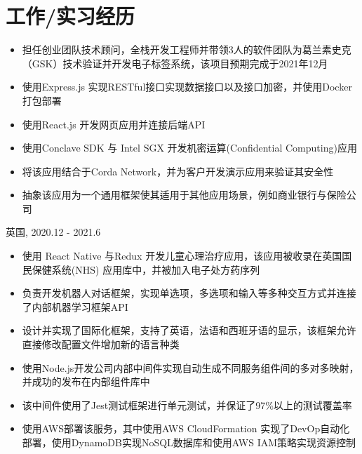 \documentclass{resume}
\begin{document}

\section{工作/实习经历}
\begin{itemize}
  \item 担任创业团队技术顾问，全栈开发工程师并带领3人的软件团队为葛兰素史克（GSK）技术验证并开发电子标签系统，该项目预期完成于2021年12月
  \item 使用Express.js 实现RESTful接口实现数据接口以及接口加密，并使用Docker打包部署
  \item 使用React.js 开发网页应用并连接后端API
\end{itemize}

\begin{itemize}
  \item 使用Conclave SDK 与 Intel SGX 开发机密运算(Confidential Computing)应用
  \item 将该应用结合于Corda Network，并为客户开发演示应用来验证其安全性
  \item 抽象该应用为一个通用框架使其适用于其他应用场景，例如商业银行与保险公司
\end{itemize}

 {英国, 2020.12 - 2021.6}
\begin{itemize}
  \item 使用 React Native 与Redux 开发儿童心理治疗应用，该应用被收录在英国国民保健系统(NHS) 应用库中，并被加入电子处方药序列
  \item 负责开发机器人对话框架，实现单选项，多选项和输入等多种交互方式并连接了内部机器学习框架API
  \item 设计并实现了国际化框架，支持了英语，法语和西班牙语的显示，该框架允许直接修改配置文件增加新的语言种类
\end{itemize}

\begin{itemize}
  \item 使用Node.js开发公司内部中间件实现自动生成不同服务组件间的多对多映射，并成功的发布在内部组件库中
  \item 该中间件使用了Jest测试框架进行单元测试，并保证了97\%以上的测试覆盖率
  \item 使用AWS部署该服务，其中使用AWS CloudFormation 实现了DevOp自动化部署，使用DynamoDB实现NoSQL数据库和使用AWS IAM策略实现资源控制
\end{itemize}
\end{document}
